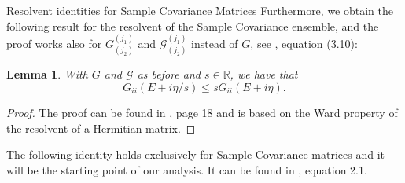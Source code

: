 \documentclass[11pt, a4paper, oneside]{book}
\numberwithin{equation}{chapter}
\newtheorem{lem}[thm]{Lemma}
\begin{document}
\begin{section}{Resolvent identities for Sample Covariance Matrices}
Furthermore, we obtain the following result for the resolvent of the Sample Covariance ensemble, and the proof works also for $G_{(j_2)}^{(j_1)}$ and $ \mathcal{G}_{(j_2)}^{(j_1)}$ instead of $G$, see \cite{cacciapuoti2015bounds}, equation (3.10):
%
\begin{lem}\label{G11eta/s}
With $G$ and $\mathcal{G}$ as before and $s \in \mathbb{R}$, we have that
\begin{equation}
G_{ii}(E+i\eta/s) \leq sG_{ii}(E+i\eta).
\end{equation}
\end{lem}
%
\begin{proof}
  The proof can be found in \cite{cacciapuoti2015bounds}, page 18 and is based on the Ward property of the resolvent of a Hermitian matrix.
\end{proof}
%
The following identity holds exclusively for Sample Covariance matrices and it will be the starting point of our analysis. It can be found in \cite{cacciapuoti2013local}, equation 2.1. 


\end{section}
\end{document}
